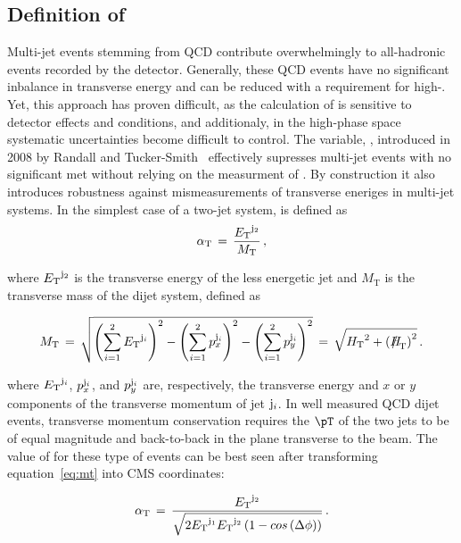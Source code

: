 \clearpage
\subsection{Definition of \texorpdfstring{\alphat}{AlphaT}\label{sec:alphat}}

Multi-jet events stemming from QCD contribute overwhelmingly to
all-hadronic events recorded by the detector. Generally, these QCD events
have no significant inbalance in transverse energy and can 
be reduced with a requirement for high-\met. Yet, this approach has proven difficult, 
as the calculation of \met is sensitive to detector effects and conditions, 
and additionaly, in the high-\met phase space systematic uncertainties become difficult
to control. The variable, \alphat, introduced in 2008 by Randall and 
Tucker-Smith~\cite{Randall:2008rw} effectively supresses multi-jet 
events with no significant met without relying on the measurment
of \met. By construction it also introduces robustness against mismeasurements 
of transverse eneriges in multi-jet systems.  In the simplest case of a two-jet system,
\alphat is defined as
\begin{equation}
\label{eq:alphat}
\alpha_{\text{T}}\, =\, \frac{{E_{\text T}}^{{\rm j}_2}}{M_\text{T}} \, ,
\end{equation}

where ${E_{\text T}}^{\rm j_2}$ is the transverse energy of the less energetic
jet and $M_\text{T}$ is the transverse mass of the dijet system,
defined as

\begin{equation}
  \label{eq:mt}
  M_\text{T}\, = \,\sqrt{ \left( \sum_{i=1}^2 \Et^{{\rm j}_i}
    \right)^2 - \left( \sum_{i=1}^2 p_x^{{\rm j}_i} \right)^2 - \left(
      \sum_{i=1}^2 p_y^{{\rm j}_i} \right)^2} \, = \,\sqrt{\scalht^2 + \left(\mht\right)^2} \,  .
\end{equation}

where ${E_{\text T}}^{{\rm j}_i}$, $p_x^{{\rm j}_i}$, and $p_y^{{\rm j}_i}$ are,
respectively, the transverse energy and $x$ or $y$ components of the
transverse momentum of jet ${\rm j}_i$. In well measured QCD dijet events, 
transverse momentum conservation requires the $\pT$ of the two jets to be 
of equal magnitude and back-to-back in the plane transverse to the beam.
The value of \alphat for these type of events can be best seen
after transforming equation~\ref{eq:mt} into CMS coordinates:

\begin{equation}
  \label{eq:mt-polar}
  \alpha_{\text{T}}\, = \,\frac{{E_{\text T}}^{{\rm j}_2}}{\sqrt{2{E_{\text T}}^{{\rm j}_1}
   {E_{\text T}}^{{\rm j}_2} \left(1-cos\left(\Delta\phi\right)\right)}}\, .
\end{equation}

